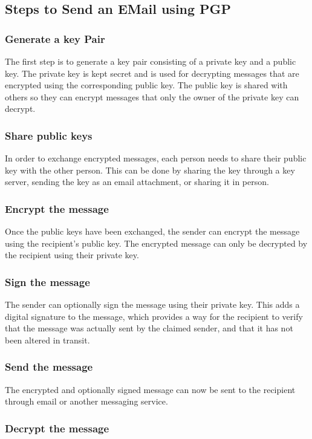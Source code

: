 \documentclass[11pt]{article}
\begin{document}
\subsection{Steps to Send an EMail using PGP}
\subsubsection{Generate a key Pair}

The first step is to generate a key pair consisting of a private key and a public key. The private key is kept secret and is used for decrypting messages that are encrypted using the corresponding public key. The public key is shared with others so they can encrypt messages that only the owner of the private key can decrypt.

\subsubsection{Share public keys}

In order to exchange encrypted messages, each person needs to share their public key with the other person. This can be done by sharing the key through a key server, sending the key as an email attachment, or sharing it in person.
\subsubsection{Encrypt the message}

Once the public keys have been exchanged, the sender can encrypt the message using the recipient's public key. The encrypted message can only be decrypted by the recipient using their private key.
\subsubsection{Sign the message}

The sender can optionally sign the message using their private key. This adds a digital signature to the message, which provides a way for the recipient to verify that the message was actually sent by the claimed sender, and that it has not been altered in transit.
\subsubsection{Send the message}

The encrypted and optionally signed message can now be sent to the recipient through email or another messaging service.
\subsubsection{Decrypt the message}
\end{document}
